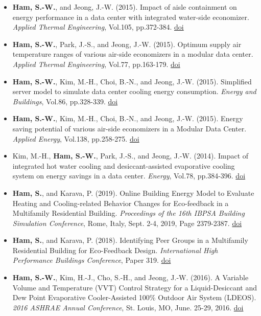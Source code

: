 \documentclass{resume}
\begin{document}
\begin{itemize}
\item{\textbf{Ham, S.-W.}, and Jeong, J.-W. (2015). Impact of aisle containment on energy performance in a data center with integrated water-side economizer. \textit{Applied Thermal Engineering}, Vol.105, pp.372-384.  \href{https://doi.org/10.1016/j.applthermaleng.2015.05.069}{doi}}
\item{\textbf{Ham, S.-W.}, Park, J.-S., and Jeong, J.-W. (2015). Optimum supply air temperature ranges of various air-side economizers in a modular data center. \textit{Applied Thermal Engineering}, Vol.77, pp.163-179. \href{https://doi.org/10.1016/j.applthermaleng.2014.12.021}{doi}}
\item{\textbf{Ham, S.-W.}, Kim, M.-H., Choi, B.-N., and Jeong, J.-W. (2015). Simplified server model to simulate data center cooling energy consumption. \textit{Energy and Buildings}, Vol.86, pp.328-339. \href{http://dx.doi.org/10.1016/j.enbuild.2014.10.058}{doi}}
\item{\textbf{Ham, S.-W.}, Kim, M.-H., Choi, B.-N., and Jeong, J.-W. (2015). Energy saving potential of various air-side economizers in a Modular Data Center. \textit{Applied Energy}, Vol.138, pp.258-275. \href{http://dx.doi.org/10.1016/j.apenergy.2014.10.066}{doi}}
\item{Kim, M.-H., \textbf{Ham, S.-W.}, Park, J.-S., and Jeong, J.-W. (2014). Impact of integrated hot water cooling and desiccant-assisted evaporative cooling system on energy savings in a data center. \textit{Energy}, Vol.78, pp.384-396. \href{http://dx.doi.org/10.1016/j.energy.2014.10.023}{doi}}
\end{itemize}
\begin{itemize}\setlength\itemsep{0.5em}\setlength\itemindent{-.1in}
\item{\textbf{Ham, S.}, and Karava, P. (2019). Online Building Energy Model to Evaluate Heating and Cooling-related Behavior Changes for Eco-feedback in a Multifamily Residential Building. \textit{Proceedings of the 16th IBPSA Building Simulation Conference}, Rome, Italy, Sept. 2-4, 2019, Page 2379-2387. \href{http://www.ibpsa.org/proceedings/BS2019/BS2019_211234.pdf}{doi}}
\item{\textbf{Ham, S.}, and Karava, P. (2018). Identifying Peer Groups in a Multifamily Residential Building for Eco-Feedback Design. \textit{International High Performance Buildings Conference}, Paper 319. \href{https://docs.lib.purdue.edu/ihpbc/319}{doi}}
\item{\textbf{Ham, S.-W.}, Kim, H.-J., Cho, S.-H., and Jeong, J.-W. (2016). A Variable Volume and Temperature (VVT) Control Strategy for a Liquid-Desiccant and Dew Point Evaporative Cooler-Assisted 100\% Outdoor Air System (LDEOS). \textit{2016 ASHRAE Annual Conference}, St. Louis, MO, June. 25-29, 2016. \href{https://www.techstreet.com/standards/st-16-c048-a-variable-volume-and-temperature-vvt-control-strategy-for-a-liquid-desiccant-and-dew-point-evaporative-cooler-assisted-100-outdoor-air-system-ldeos?product_id=1919925}{doi}}
\end{itemize}
\end{document}
